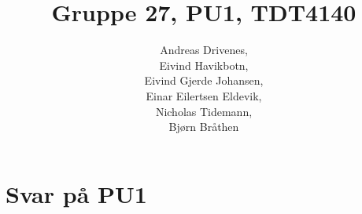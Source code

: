 \documentclass[english, a4paper]{article}
\title{Gruppe 27, PU1, TDT4140}
\author{	Andreas Drivenes,\\
		Eivind Havikbotn,\\
		Eivind Gjerde Johansen,\\
		Einar Eilertsen Eldevik,\\
		Nicholas Tidemann,\\
		Bjørn Bråthen\\
}
\begin{document}

\maketitle

\section{Svar på PU1}


\newpage


\end{document}

